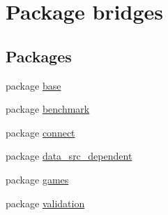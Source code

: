 \hypertarget{namespacebridges}{}\section{Package bridges}
\label{namespacebridges}
\subsection*{Packages}
\begin{DoxyCompactItemize}
\item 
package \hyperlink{namespacebridges_1_1base}{base}
\item 
package \hyperlink{namespacebridges_1_1benchmark}{benchmark}
\item 
package \hyperlink{namespacebridges_1_1connect}{connect}
\item 
package \hyperlink{namespacebridges_1_1data__src__dependent}{data\+\_\+src\+\_\+dependent}
\item 
package \hyperlink{namespacebridges_1_1games}{games}
\item 
package \hyperlink{namespacebridges_1_1validation}{validation}
\end{DoxyCompactItemize}
